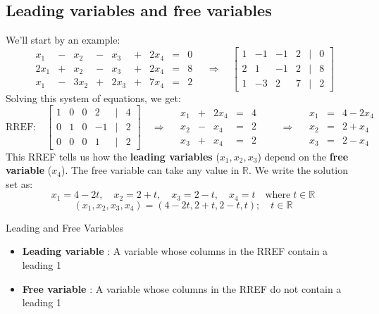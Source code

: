 \documentclass[a4paper, 9pt]{extarticle}
\begin{document}
\subsection{Leading variables and free variables}
We'll start by an example:
$$
  \begin{array}{ccccccccc}
    x_1  & - & x_2  & - & x_3  & + & 2x_4 & = & 0 \\
    2x_1 & + & x_2  & - & x_3  & + & 2x_4 & = & 8 \\
    x_1  & - & 3x_2 & + & 2x_3 & + & 7x_4 & = & 2
  \end{array}
  \quad \Rightarrow \quad
  \begin{bmatrix}
    1 & -1 & -1 & 2 & | & 0 \\
    2 & 1  & -1 & 2 & | & 8 \\
    1 & -3 & 2  & 7 & | & 2
  \end{bmatrix}
$$
Solving this system of equations, we get:
$$
  \text{RREF:}\quad
  \begin{bmatrix}
    1 & 0 & 0 & 2  & | & 4 \\
    0 & 1 & 0 & -1 & | & 2 \\
    0 & 0 & 0 & 1  & | & 2
  \end{bmatrix}
  \quad \Rightarrow \quad
  \begin{array}{ccccc}
    x_1 & + & 2x_4 & = & 4 \quad \\
    x_2 & - & x_4  & = & 2 \quad \\
    x_3 & + & x_4  & = & 2 \quad
  \end{array}
  \quad \Rightarrow \quad
  \begin{array}{ccc}
    x_1 & = & 4 - 2x_4 \\
    x_2 & = & 2 + x_4  \\
    x_3 & = & 2 - x_4
  \end{array}
$$
This RREF tells us how the \textbf{leading variables} ($x_1, x_2, x_3$) depend on the \textbf{free variable} ($x_4$). The free variable can take any value in $\mathbb{R}$. We write the solution set as:
$$x_1 = 4 - 2t, \quad x_2 = 2 + t, \quad x_3 = 2 - t, \quad x_4 = t \quad \text{where} \; t \in \mathbb{R}$$
$$(x_1, x_2, x_3, x_4) = (4-2t, 2+t, 2-t, t); \quad t \in \mathbb{R}$$
\begin{definitionbox}{Leading and Free Variables}{}
  \begin{itemize}
    \item  \textbf{Leading variable} : A variable whose columns in the RREF contain a leading 1
    \item \textbf{Free variable} : A variable whose columns in the RREF do not contain a leading 1
  \end{itemize}
\end{definitionbox}
\end{document}
